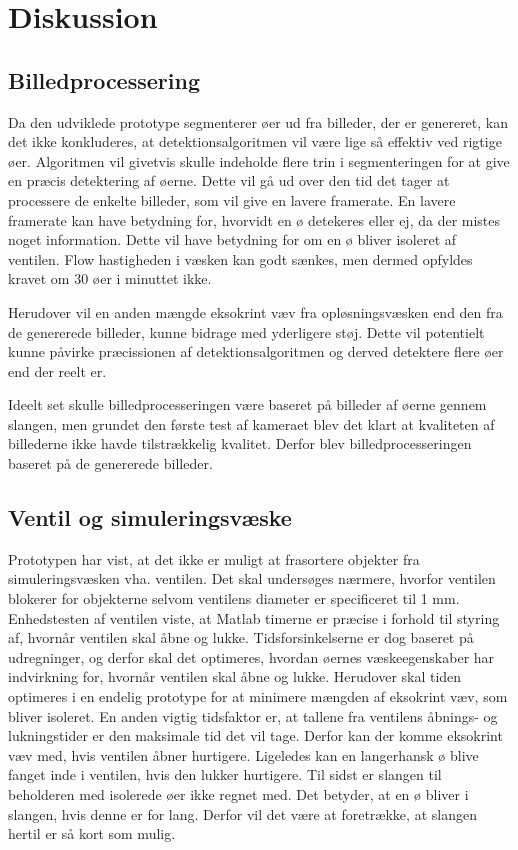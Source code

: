 \chapter{Diskussion}

\section{Billedprocessering}
Da den udviklede prototype segmenterer øer ud fra billeder, der er genereret, kan det ikke konkluderes, at detektionsalgoritmen vil være lige så effektiv ved rigtige øer. Algoritmen vil givetvis skulle indeholde flere trin i segmenteringen for at give en præcis detektering af øerne. Dette vil gå ud over den tid det tager at processere de enkelte billeder, som vil give en lavere framerate. En lavere framerate kan have betydning for, hvorvidt en ø detekeres eller ej, da der mistes noget information. Dette vil have betydning for om en ø bliver isoleret af ventilen. Flow hastigheden i væsken kan godt sænkes, men dermed opfyldes kravet om 30 øer i minuttet ikke.

Herudover vil en anden mængde eksokrint væv fra opløsningsvæsken end den fra de genererede billeder, kunne bidrage med yderligere støj. Dette vil potentielt kunne påvirke præcissionen af detektionsalgoritmen og derved detektere flere øer end der reelt er. 

Ideelt set skulle billedprocesseringen være baseret på billeder af øerne gennem slangen, men grundet den første test af kameraet blev det klart at kvaliteten af billederne ikke havde tilstrækkelig kvalitet. Derfor blev billedprocesseringen baseret på de genererede billeder. 

\section{Ventil og simuleringsvæske}
Prototypen har vist, at det ikke er muligt at frasortere objekter fra simuleringsvæsken vha. ventilen. Det skal undersøges nærmere, hvorfor ventilen blokerer for objekterne selvom ventilens diameter er specificeret til 1 mm. Enhedstesten af ventilen viste, at Matlab timerne er præcise i forhold til styring af, hvornår ventilen skal åbne og lukke. Tidsforsinkelserne er dog baseret på udregninger, og derfor skal det optimeres, hvordan øernes væskeegenskaber har indvirkning for, hvornår ventilen skal åbne og lukke. Herudover skal tiden optimeres i en endelig prototype for at minimere mængden af eksokrint væv, som bliver isoleret. En anden vigtig tidsfaktor er, at tallene fra ventilens åbnings- og lukningstider er den maksimale tid det vil tage. Derfor kan der komme eksokrint væv med, hvis ventilen åbner hurtigere. Ligeledes kan en langerhansk ø blive fanget inde i ventilen, hvis den lukker hurtigere. Til sidst er slangen til beholderen med isolerede øer ikke regnet med. Det betyder, at en ø bliver i slangen, hvis denne er for lang. Derfor vil det være at foretrække, at slangen hertil er så kort som mulig.



